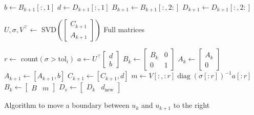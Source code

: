 \documentclass[doctype=mastersthesis,BCOR=15mm,biblatex]{ldvbook}%
\DeclareMathOperator{\diag}{diag}
\begin{document}
\begin{algorithm}[htb]
	\begin{algorithmic}

		\State $b \gets B_{k+1}[:,1]$
		\State $d \gets D_{k+1}[:,1]$
		\State $B_{k+1} \gets B_{k+1}[:,2:]$
		\State $D_{k+1} \gets D_{k+1}[:,2:]$
		
		\State $U,\sigma,V^\top \gets$ SVD$\left(\begin{bmatrix}
		C_{k+1}\\A_{k+1}
		\end{bmatrix}\right)$ Full matrices 

		\State $r \gets $ count$(\sigma>\text{tol}_i)$
		\State $a \gets U^\top \begin{bmatrix}
		d\\b
		\end{bmatrix}$
		\State $B_k \gets \begin{bmatrix}
		B_k & 0\\
		0 & 1
		\end{bmatrix}$
		\State $A_k \gets \begin{bmatrix}
		A_k \\ 0
		\end{bmatrix}$
		\State $A_{k+1} \gets [A_{k+1},b]$
		\State $C_{k+1} \gets [C_{k+1},d]$		
		\Else
		\State $m \gets V[:,:r] \diag(\sigma[:r])^{-1} a[:r]$
		\State $B_k \gets \begin{bmatrix} B & m\end{bmatrix}$
%		
		\EndIf
		\State $D_v \gets \begin{bmatrix}
		D_k&d_{\text{new}}
		\end{bmatrix}$
	\end{algorithmic}
	\caption{Algorithm to move a boundary between $u_k$ and $u_{k+1}$ to the right}\label{alg:move_right}
\end{algorithm}
\end{document}
